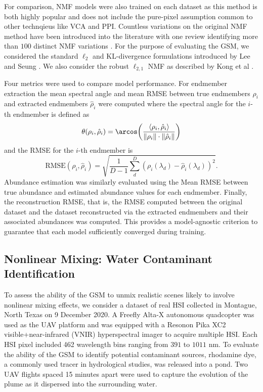 \documentclass[remotesensing,article,submit,pdftex,moreauthors]{Definitions/mdpi}
\begin{document}
For comparison, NMF models were also trained on each dataset as this method is both highly popular and does not include the pure-pixel assumption common to other technqieus like VCA and PPI. Countless variations on the original NMF method have been introduced into the literature with one review identifying more than $100$ distinct NMF variations \cite{unmixing-nmf-review}. For the purpose of evaluating the GSM, we considered the standard $\ell_2$ and KL-divergence formulations introduced by Lee and Seung \cite{nmf-algorithms}. We also consider the robust $\ell_{2,1}$ NMF as described by Kong et al \cite{nmf-l21}.

Four metrics were used to compare model performance. For endmember extraction the mean spectral angle and mean RMSE between true endmembers $\rho_i$ and extracted endmembers $\hat{\rho}_i$ were computed where the spectral angle for the $i$-th endmember is defined as 
\begin{equation}
    \theta(\rho_i, \hat{\rho}_i) =  \arcos\left( \dfrac{\langle \rho_i, \hat{\rho}_i \rangle}{\lVert \rho_i \rVert \cdot \lVert \hat{\rho}_i \rVert}\right)
\end{equation}
and the RMSE for the $i$-th endmember is
\begin{equation}
    \text{RMSE}(\rho_i, \hat{\rho}_i) = \sqrt{\frac{1}{D-1}\sum_d^D\left(\rho_i(\lambda_d) - \hat{\rho}_i(\lambda_d) \right)^2}.
\end{equation}
Abundance estimation was similarly evaluated using the Mean RMSE between true abundance and estimated abundance values for each endmember. Finally, the reconstruction RMSE, that is, the RMSE computed between the original dataset and the dataset reconstructed via the extracted endmembers and their associated abundances was computed. This provides a model-agnostic criterion to guarantee that each model sufficiently converged during training.

\subsection{Nonlinear Mixing: Water Contaminant Identification}

To assess the ability of the GSM to unmix realistic scenes likely to involve nonlinear mixing effects, we consider a dataset of real HSI collected in Montague, North Texas on 9 December 2020. A Freefly Alta-X autonomous quadcopter was used as the UAV platform and was equipped with a Resonon Pika XC2 visible+near-infrared (VNIR) hyperspectral imager to acquire multiple HSI. Each HSI pixel included 462 wavelength bins ranging from $391$ to $1011$ nm. To evaluate the ability of the GSM to identify potential contaminant sources, rhodamine dye, a commonly used tracer in hydrological studies, was released into a pond. Two UAV flights spaced 15 minutes apart were used to capture the evolution of the plume as it dispersed into the surrounding water.
\end{document}
